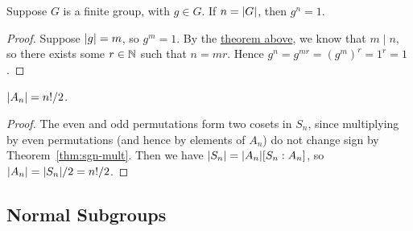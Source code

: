 \begin{corollary}\label{cor:order-element-group}
    Suppose \(G\) is a finite group, with \(g \in G\).
    If \(n = \abs{G}\), then \(g^n = 1\).
\end{corollary}
\begin{proof}
    Suppose \(\abs{g} = m\), so \(g^m = 1\).
    By the \hyperref[thm:lagrange]{theorem above},
    we know that \(m \mid n\),
    so there exists some \(r \in \mathbb{N}\) such that \(n = mr\).
    Hence \(g^n = g^{mr} = {(g^m)}^r = 1^r = 1\).
\end{proof}
\begin{corollary}
    \(\abs{A_n} = n!/2\).
\end{corollary}
\begin{proof}
    The even and odd permutations form two cosets in \(S_n\),
    since multiplying by even permutations
    (and hence by elements of \(A_n\)) do not change sign
    by Theorem~\ref{thm:sgn-mult}.
    Then we have \(\abs{S_n} = \abs{A_n}[S_n:A_n]\),
    so \(\abs{A_n} = \abs{S_n}/2 = n!/2\).
\end{proof}


\subsection{Normal Subgroups}

